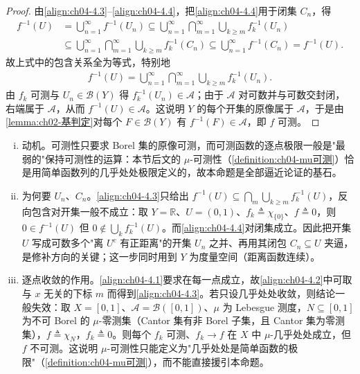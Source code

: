 \documentclass[../../main.tex]{subfiles}%
\begin{document}
\begin{proof}
由\eqref{align:ch04-4.3}--\eqref{align:ch04-4.4}，把\eqref{align:ch04-4.4}用于闭集 $C_n$，得
\begin{align*}
f^{-1}(U)&=\bigcup_{n=1}^\infty f^{-1}(U_n)\subseteq\bigcup_{n=1}^\infty\bigcap_{m=1}^\infty\bigcup_{k\geqslant m}f_k^{-1}(U_n)\\
&\subseteq\bigcup_{n=1}^\infty\bigcap_{m=1}^\infty\bigcup_{k\geqslant m}f_k^{-1}(C_n)\subseteq\bigcup_{n=1}^\infty f^{-1}(C_n)=f^{-1}(U).
\end{align*}
故上式中的包含关系全为等式，特别地
\begin{align*}
f^{-1}(U)=\bigcup_{n=1}^\infty\bigcap_{m=1}^\infty\bigcup_{k\geqslant m}f_k^{-1}(U_n).
\end{align*}
由 $f_k$ 可测与 $U_n\in\mathcal{B}(Y)$ 得 $f_k^{-1}(U_n)\in\mathcal{A}$；由于 $\mathcal{A}$ 对可数并与可数交封闭，右端属于 $\mathcal{A}$，从而 $f^{-1}(U)\in\mathcal{A}$。这说明 $Y$ 的每个开集的原像属于 $\mathcal{A}$，于是由\cref{lemma:ch02-基判定}对每个 $F\in\mathcal{B}(Y)$ 有 $f^{-1}(F)\in\mathcal{A}$，即 $f$ 可测。
\end{proof}

\begin{remark}\label{remark:ch04-逐点极限动机}
\begin{enumerate}[(i)]
\item 动机。可测性只要求 Borel 集的原像可测，而可测函数的逐点极限一般是"最弱的"保持可测性的运算：本节后文的 $\mu$-可测性（\cref{definition:ch04-mu可测}）恰是用简单函数列的几乎处处极限定义的，故本命题是全部逼近论证的基石。
\item 为何要 $U_n$、$C_n$。\eqref{align:ch04-4.3}只给出 $f^{-1}(U)\subseteq\bigcap_m\bigcup_{k\geqslant m}f_k^{-1}(U)$，反向包含对开集一般不成立：取 $Y=\mathbb{R}$、$U=(0,1)$、$f_k\triangleq\chi_{\{0\}}$、$f\triangleq0$，则 $0\in f^{-1}(U)$ 但 $0\notin\bigcup_kf_k^{-1}(U)$。而\eqref{align:ch04-4.4}对闭集成立。因此把开集 $U$ 写成可数多个"离 $U^c$ 有正距离"的开集 $U_n$ 之并、再用其闭包 $C_n\subseteq U$ 夹逼，是修补方向的关键；这一步同时用到 $Y$ 为度量空间（距离函数连续）。
\item 逐点收敛的作用。\eqref{align:ch04-4.1}要求在每一点成立，故\eqref{align:ch04-4.2}中可取与 $x$ 无关的下标 $m$ 而得到\eqref{align:ch04-4.3}。若只设几乎处处收敛，则结论一般失效：取 $X=[0,1]$、$\mathcal{A}=\mathcal{B}([0,1])$、$\mu$ 为 Lebesgue 测度，$N\subseteq[0,1]$ 为不可 Borel 的 $\mu$-零测集（Cantor 集有非 Borel 子集，且 Cantor 集为零测集），$f\triangleq\chi_N$，$f_k\triangleq0$。则每个 $f_k$ 可测、$f_k\to f$ 在 $X$ 中 $\mu$-几乎处处成立，但 $f$ 不可测。这说明 $\mu$-可测性只能定义为"几乎处处是简单函数的极限"（\cref{definition:ch04-mu可测}），而不能直接援引本命题。
\end{enumerate}
\end{remark}
\end{document}
